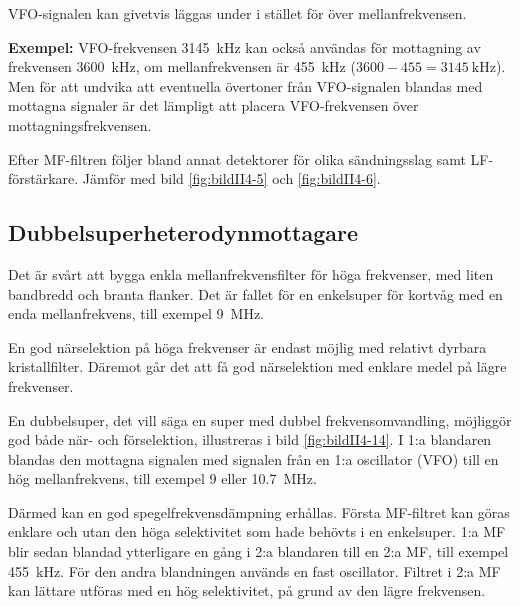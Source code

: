 VFO-signalen kan givetvis läggas under i stället för över mellanfrekvensen.

\textbf{Exempel:}
VFO-frekvensen \SI{3145}{\kilo\hertz} kan också användas för mottagning av
frekvensen \SI{3600}{\kilo\hertz}, om mellanfrekvensen är \SI{455}{\kilo\hertz}
(\(3600 - 455 = \SI{3145}{\kilo\hertz}\)).
Men för att undvika att eventuella övertoner från VFO-signalen blandas med
mottagna signaler är det lämpligt att placera VFO-frekvensen över
mottagningsfrekvensen.

Efter MF-filtren följer bland annat detektorer för olika sändningsslag samt
LF-förstärkare.
Jämför med bild \ref{fig:bildII4-5} och \ref{fig:bildII4-6}.

\subsection{Dubbelsuperheterodynmottagare}

Det är svårt att bygga enkla mellanfrekvensfilter för höga frekvenser,
med liten bandbredd och branta flanker.
Det är fallet för en enkelsuper för kortvåg med en enda mellanfrekvens, till
exempel \SI{9}{\mega\hertz}.

En god närselektion på höga frekvenser är endast möjlig med relativt
dyrbara kristallfilter.
Däremot går det att få god närselektion med enklare medel på lägre frekvenser.

En dubbelsuper, det vill säga en super med dubbel frekvensomvandling,
möjliggör god både när- och förselektion, illustreras i bild
\ref{fig:bildII4-14}.
I 1:a blandaren blandas den mottagna signalen med signalen från en 1:a
oscillator (VFO) till en hög mellanfrekvens, till exempel 9 eller
\SI{10,7}{\mega\hertz}.

Därmed kan en god spegelfrekvensdämpning erhållas.
Första MF-filtret kan göras enklare och utan den höga selektivitet som hade
behövts i en enkelsuper.
1:a MF blir sedan blandad ytterligare en gång i 2:a blandaren till en 2:a MF,
till exempel \SI{455}{\kilo\hertz}.
För den andra blandningen används en fast oscillator.
Filtret i 2:a MF kan lättare utföras med en hög selektivitet, på grund av den
lägre frekvensen.


